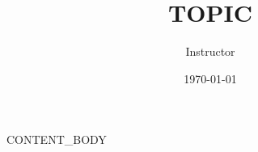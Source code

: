 \documentclass{beamer}
\title{{{TOPIC}}}
\author{Instructor}
\date{\today}
\begin{document}
\begin{frame}
    \titlepage
\end{frame}

{{CONTENT_BODY}}
\end{document}
